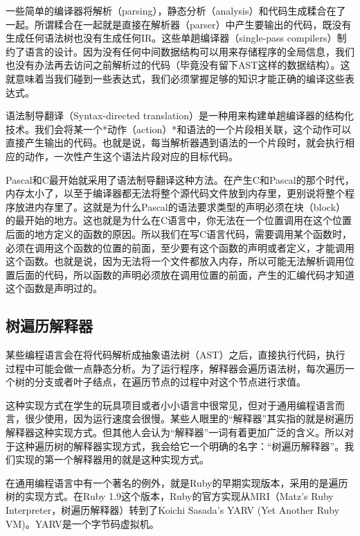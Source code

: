 \documentclass[cn,10pt,math=newtx,citestyle=gb7714-2015,bibstyle=gb7714-2015]{elegantbook}
\begin{document}
一些简单的编译器将解析（parsing），静态分析（analysis）和代码生成糅合在了一起。所谓糅合在一起就是直接在解析器（parser）中产生要输出的代码，既没有生成任何语法树也没有生成任何IR。这些单趟编译器（single-pass compilers）制约了语言的设计。因为没有任何中间数据结构可以用来存储程序的全局信息，我们也没有办法再去访问之前解析过的代码（毕竟没有留下AST这样的数据结构）。这就意味着当我们碰到一些表达式，我们必须掌握足够的知识才能正确的编译这些表达式。

\begin{tcolorbox}
语法制导翻译（Syntax-directed translation）是一种用来构建单趟编译器的结构化技术。我们会将某一个*动作（action）*和语法的一个片段相关联，这个动作可以直接产生输出的代码。也就是说，每当解析器遇到语法的一个片段时，就会执行相应的动作，一次性产生这个语法片段对应的目标代码。
\end{tcolorbox}

Pascal和C最开始就采用了语法制导翻译这种方法。在产生C和Pascal的那个时代，内存太小了，以至于编译器都无法将整个源代码文件放到内存里，更别说将整个程序放进内存里了。这就是为什么Pascal的语法要求类型的声明必须在块（block）的最开始的地方。这也就是为什么在C语言中，你无法在一个位置调用在这个位置后面的地方定义的函数的原因。所以我们在写C语言代码，需要调用某个函数时，必须在调用这个函数的位置的前面，至少要有这个函数的声明或者定义，才能调用这个函数。也就是说，因为无法将一个文件都放入内存，所以可能无法解析调用位置后面的代码，所以函数的声明必须放在调用位置的前面，产生的汇编代码才知道这个函数是声明过的。

\subsection{树遍历解释器}

某些编程语言会在将代码解析成抽象语法树（AST）之后，直接执行代码，执行过程中可能会做一点静态分析。为了运行程序，解释器会遍历语法树，每次遍历一个树的分支或者叶子结点，在遍历节点的过程中对这个节点进行求值。

这种实现方式在学生的玩具项目或者小小语言中很常见，但对于通用编程语言而言，很少使用，因为运行速度会很慢。某些人眼里的“解释器”其实指的就是树遍历解释器这种实现方式。但其他人会认为“解释器”一词有着更加广泛的含义。所以对于这种遍历树的解释器实现方式，我会给它一个明确的名字：“树遍历解释器”。我们实现的第一个解释器用的就是这种实现方式。

\begin{tcolorbox}
在通用编程语言中有一个著名的例外，就是Ruby的早期实现版本，采用的是遍历树的实现方式。在Ruby 1.9这个版本，Ruby的官方实现从MRI（Matz’s Ruby Interpreter，树遍历解释器）转到了Koichi Sasada’s YARV (Yet Another Ruby VM)。YARV是一个字节码虚拟机。
\end{tcolorbox}
\end{document}
